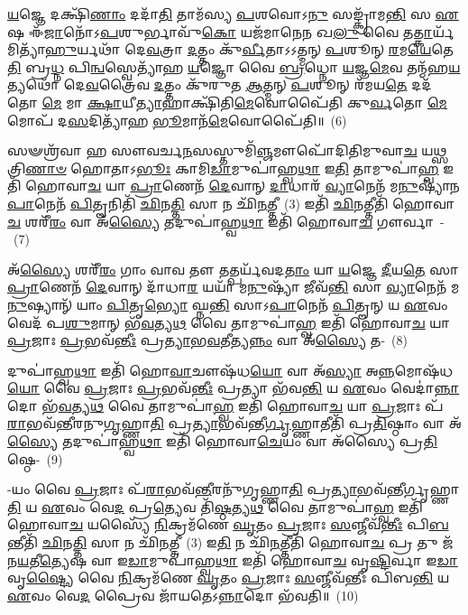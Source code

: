 \-\ul{𑌯}\-𑌜𑍍𑌞𑍇 𑌦𑌕𑍍𑌷𑌿᳴\-\ul{𑌣𑌾𑌂} 𑌦𑌦𑌾᳴\-\ul{𑌤𑌿} 𑌤𑌾𑌮᳴𑌸𑍍𑌯 \ul{𑌪}\-𑌶𑌵𑍋\-𑌽\-\ul{𑌨𑍁} 𑌸𑌙𑍍𑌕𑍍𑌰𑌾᳴𑌮\-\ul{𑌨𑍍𑌤𑌿} 𑌸 \ul{𑌏}\-𑌷 𑌈᳴\-\ul{𑌜𑌾}\-𑌨𑍋᳴\-𑌽\-\ul{𑌪}\-𑌶𑍁𑌰𑍍𑌭𑌾𑌵𑍁᳴\-\ul{𑌕𑍋} 𑌯𑌜᳴𑌮𑌾𑌨𑍇\-\ul{𑌨} 𑌖\-\ul{𑌲𑍁} 𑌵𑍈 𑌤\-\ul{𑌤𑍍𑌕𑌾}\-𑌰𑍍𑌯᳴𑌮𑌿𑌤𑍍𑌯𑌾᳴\-\ul{𑌹𑍁}\-𑌰𑍍𑌯𑌥𑌾᳴ 𑌦𑍇\-\ul{𑌵}\-𑌤𑍍𑌰𑌾 \ul{𑌦}\-𑌤𑍍𑌤𑌂 𑌕𑍁᳴\-\ul{𑌰𑍍𑌵𑍀}\-𑌤𑌾𑌽𑌽𑌤𑍍𑌮𑌨𑍍 \ul{𑌪}\-𑌶𑍂𑌨𑍍 \ul{𑌰}\-𑌮\-\ul{𑌯𑍇}\-𑌤𑍇\-\ul{𑌤𑌿} 𑌬𑍍𑌰\-\ul{𑌧𑍍𑌨} 𑌪𑌿\-\ul{𑌨𑍍𑌵}\-𑌸𑍍𑌵𑍇𑌤𑍍𑌯𑌾᳴𑌹 \ul{𑌯}\-𑌜𑍍𑌞𑍋 𑌵𑍈 \ul{𑌬𑍍𑌰}\-𑌧𑍍𑌨𑍋 \ul{𑌯}\-𑌜𑍍𑌞\-\ul{𑌮𑍇}\-𑌵 𑌤𑌨𑍍𑌮᳴𑌹\-\ul{𑌯}\-𑌤𑍍𑌯𑌥𑍋᳴ 𑌦𑍇\-\ul{𑌵}\-𑌤𑍍𑌰𑍈𑌵 \ul{𑌦}\-𑌤𑍍𑌤𑌂 𑌕𑍁᳴𑌰𑍁𑌤 \ul{𑌆}\-𑌤𑍍𑌮𑌨𑍍 \ul{𑌪}\-𑌶𑍂𑌨𑍍 𑌰᳴𑌮𑌯\-\ul{𑌤𑍇} 𑌦𑌦᳴𑌤𑍋 \ul{𑌮𑍇} 𑌮𑌾 \ul{𑌕𑍍𑌷𑌾}\-𑌯𑍀\-\ul{𑌤𑍍𑌯𑌾}\-𑌹𑌾𑌕𑍍𑌷𑌿᳴𑌤𑌿\-\ul{𑌮𑍇}\-𑌵𑍋𑌪𑍈᳴𑌤𑌿 𑌕𑍁\-\ul{𑌰𑍍𑌵}\-𑌤𑍋 \ul{𑌮𑍇} 𑌮𑍋𑌪᳴ 𑌦\-\ul{𑌸}\-𑌦𑌿𑌤𑍍𑌯𑌾᳴𑌹 \ul{𑌭𑍂}\-𑌮𑌾𑌨᳴\-\ul{𑌮𑍇}\-𑌵𑍋𑌪𑍈᳴𑌤𑌿॥~(6)

{\anuvakamend[{\-\ul{𑌵𑌿}\-𑌦𑍍𑌵𑌾𑌨𑍍𑌧𑍍𑌯𑌾᳴\-\ul{𑌯𑍇} 𑌦𑍍𑌯𑌂 \ul{𑌪𑍍𑌰𑌾}\-𑌶𑍍𑌞\-\ul{𑌨𑍍𑌤𑌿} 𑌯𑌾𑌂 𑌵𑍈 \ul{𑌮} 𑌏\-\ul{𑌕𑌾}\-𑌨𑍍𑌨𑌵𑌿𑍞᳴\-\ul{𑌶}\-𑌤𑌿𑌶𑍍𑌚᳴}]}%

𑌸𑍟𑌶𑍍𑌰᳴𑌵𑌾 𑌹 𑌸𑍗𑌵𑌰𑍍𑌚\-\ul{𑌨}\-𑌸𑌸𑍍𑌤𑍁𑌮𑌿᳴\-\ul{𑌞𑍍𑌜}\-𑌮𑍗𑌪𑍋᳴𑌦𑌿𑌤𑌿𑌮𑍁𑌵𑌾\-\ul{𑌚} 𑌯\-\ul{𑌥𑍍𑌸}\-𑌤𑍍𑌰𑌿\-\ul{𑌣𑌾}\-\-\ul{𑍞} 𑌹𑍋𑌤𑌾\-𑌽\-\ul{𑌭𑍂𑌃} 𑌕𑌾𑌮𑌿\-\ul{𑌡𑌾}\-𑌮𑍁𑌪𑌾॑𑌹𑍍𑌵\-\ul{𑌥𑌾} 𑌇\-\ul{𑌤𑌿} 𑌤𑌾𑌮𑍁𑌪𑌾॑\-\ul{𑌹𑍍𑌵} 𑌇𑌤𑌿᳴ 𑌹𑍋𑌵𑌾\-\ul{𑌚} 𑌯𑌾 \ul{𑌪𑍍𑌰𑌾}\-𑌣𑍇𑌨᳴ \ul{𑌦𑍇}\-𑌵𑌾𑌨𑍍 \ul{𑌦𑌾}\-𑌧𑌾𑌰᳴ \ul{𑌵𑍍𑌯𑌾}\-𑌨𑍇𑌨᳴ 𑌮\-\ul{𑌨𑍁}\-𑌷𑍍𑌯𑌾᳴𑌨\-\ul{𑌪𑌾}\-𑌨𑍇𑌨᳴ \ul{𑌪𑌿}\-𑌤𑍄𑌨𑌿𑌤𑌿᳴ \ul{𑌛𑌿}\-𑌨\-\ul{𑌤𑍍𑌤𑌿} 𑌸𑌾 𑌨 𑌛𑌿᳴\-\ul{𑌨}\-𑌤𑍍𑌤𑍀~(3) 𑌇𑌤𑌿᳴ \ul{𑌛𑌿}\-𑌨𑌤𑍍𑌤𑍀𑌤𑌿᳴ 𑌹𑍋𑌵𑌾\-\ul{𑌚} 𑌶𑌰𑍀᳴\-\ul{𑌰𑌂} 𑌵𑌾 𑌅᳴\-\ul{𑌸𑍍𑌯𑍈} 𑌤𑌦𑍁𑌪𑌾॑𑌹𑍍𑌵\-\ul{𑌥𑌾} 𑌇𑌤𑌿᳴ 𑌹𑍋𑌵𑌾\-\ul{𑌚} 𑌗𑍗𑌰𑍍𑌵𑌾~-~(7)

𑌅᳴\-\ul{𑌸𑍍𑌯𑍈} 𑌶𑌰𑍀᳴\-\ul{𑌰𑌂} 𑌗𑌾𑌂 𑌵𑌾𑌵 𑌤𑍗 𑌤𑌤𑍍𑌪𑌰𑍍𑌯᳴𑌵𑌦\-\ul{𑌤𑌾𑌂} 𑌯𑌾 \ul{𑌯}\-𑌜𑍍𑌞𑍇 \ul{𑌦𑍀}\-𑌯\-\ul{𑌤𑍇} 𑌸𑌾 \ul{𑌪𑍍𑌰𑌾}\-𑌣𑍇𑌨᳴ \ul{𑌦𑍇}\-𑌵𑌾𑌨𑍍 𑌦𑌾᳴𑌧𑌾\-\ul{𑌰} 𑌯𑌯𑌾᳴ 𑌮\-\ul{𑌨𑍁}\-𑌷𑍍𑌯𑌾᳴ 𑌜𑍀𑌵᳴\-\ul{𑌨𑍍𑌤𑌿} 𑌸𑌾 \ul{𑌵𑍍𑌯𑌾}\-𑌨𑍇𑌨᳴ 𑌮\-\ul{𑌨𑍁}\-𑌷𑍍𑌯𑌾𑌨𑍍᳴ 𑌯𑌾𑌂 \ul{𑌪𑌿}\-𑌤𑍃\-\ul{𑌭𑍍𑌯𑍋} 𑌘𑍍𑌨\-\ul{𑌨𑍍𑌤𑌿} 𑌸𑌾\-𑌽\-\ul{𑌪𑌾}\-𑌨𑍇𑌨᳴ \ul{𑌪𑌿}\-𑌤𑍄𑌨𑍍 𑌯 \ul{𑌏}\-𑌵𑌂 𑌵𑍇𑌦᳴ 𑌪\-\ul{𑌶𑍁}\-𑌮𑌾𑌨𑍍 𑌭᳴\-\ul{𑌵}\-𑌤𑍍𑌯\-\ul{𑌥} 𑌵𑍈 𑌤𑌾𑌮𑍁𑌪𑌾॑\-\ul{𑌹𑍍𑌵} 𑌇𑌤𑌿᳴ 𑌹𑍋𑌵𑌾\-\ul{𑌚} 𑌯𑌾 \ul{𑌪𑍍𑌰}\-𑌜𑌾𑌃 \ul{𑌪𑍍𑌰}\-𑌭𑌵᳴\-\ul{𑌨𑍍𑌤𑍀𑌃} 𑌪𑍍𑌰\-\ul{𑌤𑍍𑌯𑌾}\-𑌭\-\ul{𑌵}\-𑌤𑍀𑌤𑍍𑌯\-\ul{𑌨𑍍𑌨𑌂} 𑌵𑌾 𑌅᳴\-\ul{𑌸𑍍𑌯𑍈} 𑌤-~(8)

𑌦𑍁𑌪𑌾॑𑌹𑍍𑌵\-\ul{𑌥𑌾} 𑌇𑌤𑌿᳴ 𑌹𑍋\-\ul{𑌵𑌾}\-𑌚𑍗𑌷᳴𑌧\-\ul{𑌯𑍋} 𑌵𑌾 𑌅᳴\-\ul{𑌸𑍍𑌯𑌾} 𑌅\-\ul{𑌨𑍍𑌨}\-𑌮𑍋𑌷᳴𑌧\-\ul{𑌯𑍋} 𑌵𑍈 \ul{𑌪𑍍𑌰}\-𑌜𑌾𑌃 \ul{𑌪𑍍𑌰}\-𑌭𑌵᳴\-\ul{𑌨𑍍𑌤𑍀𑌃} 𑌪𑍍𑌰𑌤𑍍𑌯𑌾 𑌭᳴𑌵\-\ul{𑌨𑍍𑌤𑌿} 𑌯 \ul{𑌏}\-𑌵𑌂 𑌵𑍇𑌦𑌾॑\-\ul{𑌨𑍍𑌨𑌾}\-𑌦𑍋 𑌭᳴\-\ul{𑌵}\-𑌤𑍍𑌯\-\ul{𑌥} 𑌵𑍈 𑌤𑌾𑌮𑍁𑌪𑌾॑\-\ul{𑌹𑍍𑌵} 𑌇𑌤𑌿᳴ 𑌹𑍋𑌵𑌾\-\ul{𑌚} 𑌯𑌾 \ul{𑌪𑍍𑌰}\-𑌜𑌾𑌃 𑌪᳴\-\ul{𑌰𑌾}\-𑌭𑌵᳴𑌨𑍍𑌤𑍀𑌰𑌨𑍁\-\ul{𑌗𑍃}\-𑌹𑍍𑌣𑌾\-\ul{𑌤𑌿} 𑌪𑍍𑌰\-\ul{𑌤𑍍𑌯𑌾}\-𑌭𑌵᳴𑌨𑍍𑌤𑍀\-\ul{𑌰𑍍𑌗𑍃}\-𑌹𑍍𑌣𑌾𑌤𑍀𑌤𑌿᳴ 𑌪𑍍𑌰\-\ul{𑌤𑌿}\-𑌷𑍍𑌠𑌾𑌂 𑌵𑌾 𑌅᳴\-\ul{𑌸𑍍𑌯𑍈} 𑌤𑌦𑍁𑌪𑌾॑𑌹𑍍𑌵\-\ul{𑌥𑌾} 𑌇𑌤𑌿᳴ 𑌹𑍋𑌵𑌾\-\ul{𑌚𑍇}\-𑌯𑌂 𑌵𑌾 𑌅᳴𑌸𑍍𑌯𑍈 𑌪𑍍𑌰\-\ul{𑌤𑌿}\-𑌷𑍍𑌠𑍇-~(9)

-𑌯𑌂 𑌵𑍈 \ul{𑌪𑍍𑌰}\-𑌜𑌾𑌃 𑌪᳴\-\ul{𑌰𑌾}\-𑌭𑌵᳴\-\ul{𑌨𑍍𑌤𑍀}\-𑌰𑌨𑍁᳴𑌗𑍃𑌹𑍍𑌣𑌾\-\ul{𑌤𑌿} 𑌪𑍍𑌰\-\ul{𑌤𑍍𑌯𑌾}\-𑌭𑌵᳴𑌨𑍍𑌤𑍀𑌰𑍍𑌗𑍃𑌹𑍍𑌣𑌾\-\ul{𑌤𑌿} 𑌯 \ul{𑌏}\-𑌵𑌂 𑌵𑍇\-\ul{𑌦} 𑌪𑍍𑌰\-\ul{𑌤𑍍𑌯𑍇}\-𑌵 𑌤𑌿᳴\-\ul{𑌷𑍍𑌠}\-𑌤𑍍𑌯\-\ul{𑌥} 𑌵𑍈 𑌤𑌾𑌮𑍁𑌪𑌾॑\-\ul{𑌹𑍍𑌵} 𑌇𑌤𑌿᳴ 𑌹𑍋𑌵𑌾\-\ul{𑌚} 𑌯𑌸𑍍𑌯𑍈᳴ \ul{𑌨𑌿}\-𑌕𑍍𑌰𑌮᳴𑌣𑍇 \ul{𑌘𑍃}\-𑌤𑌂 \ul{𑌪𑍍𑌰}\-𑌜𑌾𑌃 \ul{𑌸}\-𑌞𑍍𑌜𑍀𑌵᳴\-\ul{𑌨𑍍𑌤𑍀𑌃} 𑌪𑌿\-\ul{𑌬}\-𑌨𑍍𑌤𑍀𑌤𑌿᳴ \ul{𑌛𑌿}\-𑌨\-\ul{𑌤𑍍𑌤𑌿} 𑌸𑌾 𑌨 𑌛𑌿᳴\-\ul{𑌨}\-𑌤𑍍𑌤𑍀~(3) 𑌇\-\ul{𑌤𑌿} 𑌨 𑌛𑌿᳴\-\ul{𑌨}\-𑌤𑍍𑌤𑍀𑌤𑌿᳴ 𑌹𑍋𑌵𑌾\-\ul{𑌚} 𑌪𑍍𑌰 𑌤𑍁 𑌜᳴𑌨\-\ul{𑌯}\-𑌤𑍀\-\ul{𑌤𑍍𑌯𑍇}\-𑌷 𑌵𑌾 𑌇\-\ul{𑌡𑌾}\-𑌮𑍁𑌪𑌾॑𑌹𑍍𑌵\-\ul{𑌥𑌾} 𑌇𑌤𑌿᳴ 𑌹𑍋𑌵𑌾\-\ul{𑌚} 𑌵𑍃\-\ul{𑌷𑍍𑌟𑌿}\-𑌰𑍍𑌵𑌾 𑌇\-\ul{𑌡𑌾} 𑌵𑍃\-\ul{𑌷𑍍𑌟𑍍𑌯𑍈} 𑌵𑍈 \ul{𑌨𑌿}\-𑌕𑍍𑌰𑌮᳴𑌣𑍇 \ul{𑌘𑍃}\-𑌤𑌂 \ul{𑌪𑍍𑌰}\-𑌜𑌾𑌃 \ul{𑌸}\-𑌞𑍍𑌜𑍀𑌵᳴𑌨𑍍𑌤𑍀𑌃 𑌪𑌿𑌬\-\ul{𑌨𑍍𑌤𑌿} 𑌯 \ul{𑌏}\-𑌵𑌂 𑌵𑍇\-\ul{𑌦} 𑌪𑍍𑌰𑍈𑌵 𑌜𑌾᳴𑌯𑌤𑍇\-𑌽\-\ul{𑌨𑍍𑌨𑌾}\-𑌦𑍋 𑌭᳴𑌵𑌤𑌿॥~(10)


